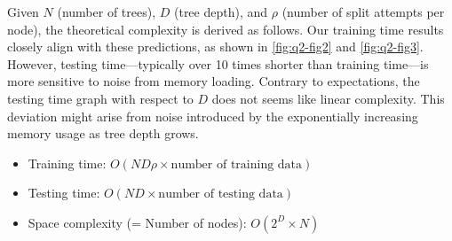 \noindent
Given $N$ (number of trees), $D$ (tree depth), and $\rho$ (number of split attempts per node), the theoretical complexity is derived as follows. Our training time results closely align with these predictions, as shown in \cref{fig:q2-fig2} and \cref{fig:q2-fig3}. However, testing time—typically over 10 times shorter than training time—is more sensitive to noise from memory loading. Contrary to expectations, the testing time graph with respect to $D$ does not seems like linear complexity. This deviation might arise from noise introduced by the exponentially increasing memory usage as tree depth grows.

\begin{itemize}
	\item Training time: $O(ND\rho \times \text{number of training data})$
	\item Testing time: $O(ND \times \text{number of testing data})$
	\item Space complexity (= Number of nodes): $O(2^{D} \times N)$
\end{itemize}

